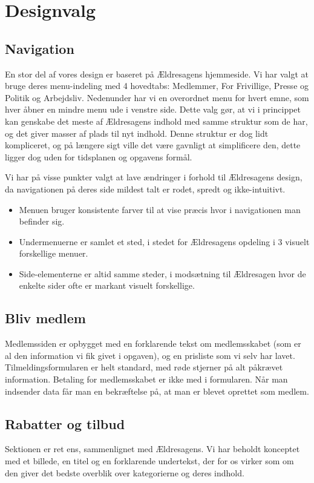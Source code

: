 \section{Designvalg}
\subsection{Navigation}
En stor del af vores design er baseret på Ældresagens hjemmeside. Vi har
valgt at bruge deres menu-indeling med 4 hovedtabs: Medlemmer, For Frivillige,
Presse og Politik og Arbejdsliv. Nedenunder har vi en overordnet menu for hvert
emne, som hver åbner en mindre menu ude i venstre side. Dette valg gør, at vi i
princippet kan genskabe det meste af Ældresagens indhold med samme struktur som de
har, og det giver masser af plads til nyt indhold. Denne struktur er dog lidt kompliceret,
og på længere sigt ville det være gavnligt at simplificere den, dette ligger dog uden for
tidsplanen og opgavens formål.

Vi har på visse punkter valgt at lave ændringer i forhold til Ældresagens design, da
navigationen på deres side mildest talt er rodet, spredt og ikke-intuitivt. 

\begin{itemize}
\item Menuen bruger konsistente farver til at vise præcis hvor i navigationen man befinder sig.
\item Undermenuerne er samlet et sted, i stedet for Ældresagens opdeling i 3 visuelt forskellige menuer.
\item Side-elementerne er altid samme steder, i modsætning til Ældresagen hvor de enkelte sider
      ofte er markant visuelt forskellige.
\end{itemize}

\subsection{Bliv medlem}
Medlemssiden er opbygget med en forklarende tekst om medlemsskabet (som er al den information vi fik givet i opgaven),
og en prisliste som vi selv har lavet. Tilmeldingsformularen er helt standard, med røde stjerner på alt påkrævet information.
Betaling for medlemsskabet er ikke med i formularen. Når man indsender data får man en bekræftelse på, at man er blevet oprettet
som medlem.

\subsection{Rabatter og tilbud}
Sektionen er ret ens, sammenlignet med Ældresagens. Vi har beholdt konceptet med et billede, en titel og en forklarende undertekst, der for os virker som om den giver det bedste overblik over kategorierne og deres indhold.

